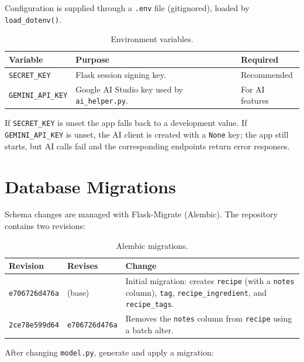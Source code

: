 \documentclass[11pt,a4paper]{article}
\newcommand{\code}[1]{\texttt{#1}}
\begin{document}
Configuration is supplied through a \code{.env} file (gitignored), loaded by
\code{load\_dotenv()}.

\begin{table}[h]
\centering
\small
\begin{tabularx}{\textwidth}{@{}lXl@{}}
\toprule
\textbf{Variable} & \textbf{Purpose} & \textbf{Required} \\
\midrule
\code{SECRET\_KEY}     & Flask session signing key. & Recommended \\
\code{GEMINI\_API\_KEY} & Google AI Studio key used by \code{ai\_helper.py}. & For AI features \\
\bottomrule
\end{tabularx}
\caption{Environment variables.}
\end{table}

If \code{SECRET\_KEY} is unset the app falls back to a development value. If
\code{GEMINI\_API\_KEY} is unset, the AI client is created with a \code{None}
key; the app still starts, but AI calls fail and the corresponding endpoints
return error responses.

\section{Database Migrations}

Schema changes are managed with Flask-Migrate (Alembic). The repository contains
two revisions:

\begin{table}[h]
\centering
\small
\begin{tabularx}{\textwidth}{@{}llX@{}}
\toprule
\textbf{Revision} & \textbf{Revises} & \textbf{Change} \\
\midrule
\code{e706726d476a} & (base)          & Initial migration: creates \code{recipe} (with a \code{notes} column), \code{tag}, \code{recipe\_ingredient}, and \code{recipe\_tags}. \\
\code{2ce78e599d64} & \code{e706726d476a} & Removes the \code{notes} column from \code{recipe} using a batch alter. \\
\bottomrule
\end{tabularx}
\caption{Alembic migrations.}
\end{table}

After changing \code{model.py}, generate and apply a migration:
\end{document}
